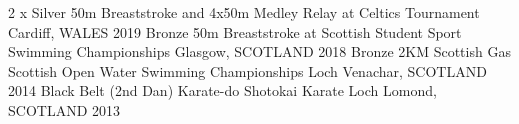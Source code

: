 

\begin{cvhonors}
  \cvhonor
    {2 x Silver} %
    {50m Breaststroke and 4x50m Medley Relay at Celtics Tournament} %
    {Cardiff, WALES} %
    {2019} %
  \cvhonor
    {Bronze} %
    {50m Breaststroke at Scottish Student Sport Swimming Championships} %
    {Glasgow, SCOTLAND} %
    {2018} %
  \cvhonor
    {Bronze} %
    {2KM Scottish Gas Scottish Open Water Swimming Championships} %
    {Loch Venachar, SCOTLAND} %
    {2014} %
  \cvhonor
    {Black Belt (2nd Dan)} %
    {Karate-do Shotokai Karate} %
    {Loch Lomond, SCOTLAND} %
    {2013} %
\end{cvhonors}
